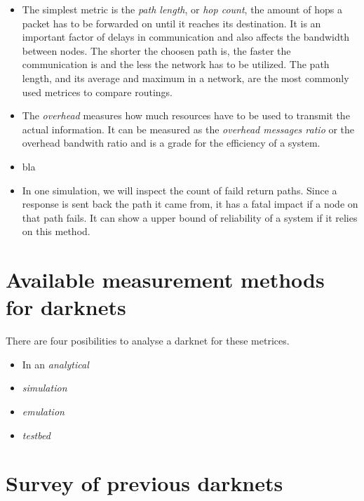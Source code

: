\begin{itemize}
\item The simplest metric is the \emph{path length}, or \emph{hop count}, the amount of hops a packet has to be forwarded on until it reaches its destination. It is an important factor of delays in communication and also affects the bandwidth between nodes. The shorter the choosen path is, the faster the communication is and the less the network has to be utilized. The path length, and its average and maximum in a network, are the most commonly used metrices to compare routings.

\item The \emph{overhead} measures how much resources have to be used to transmit the actual information. It can be measured as the \emph{overhead messages ratio} or the overhead bandwith ratio and is a grade for the efficiency of a system.

\item bla

\item In one simulation, we will inspect the count of faild return paths. Since a response is sent back the path it came from, it has a fatal impact if a node on that path fails. It can show a upper bound of reliability of a system if it relies on this method.
\end{itemize}

\section{Available measurement methods for darknets}

There are four posibilities to analyse a darknet for these metrices. 

\begin{itemize}
\item In an \emph{analytical} 

\item \emph{simulation}

\item \emph{emulation}

\item \emph{testbed}

\end{itemize}

\section{Survey of previous darknets}


